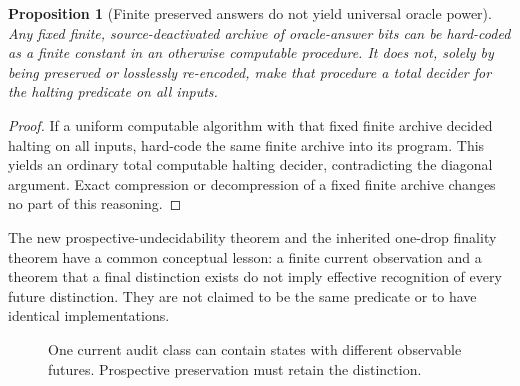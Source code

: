 \documentclass[11pt,letterpaper]{article}
\newtheorem{proposition}[theorem]{Proposition}
\theoremstyle{definition}
\begin{document}
\begin{proposition}[Finite preserved answers do not yield universal oracle power]
Any fixed finite, source-deactivated archive of oracle-answer bits can be hard-coded as a finite constant in an otherwise computable procedure. It does not, solely by being preserved or losslessly re-encoded, make that procedure a total decider for the halting predicate on all inputs.
\end{proposition}
\begin{proof}
If a uniform computable algorithm with that fixed finite archive decided halting on all inputs, hard-code the same finite archive into its program. This yields an ordinary total computable halting decider, contradicting the diagonal argument. Exact compression or decompression of a fixed finite archive changes no part of this reasoning.
\end{proof}

The new prospective-undecidability theorem and the inherited one-drop finality theorem have a common conceptual lesson: a finite current observation and a theorem that a final distinction exists do not imply effective recognition of every future distinction. They are not claimed to be the same predicate or to have identical implementations.

\begin{figure}[htbp]\centering
{}
\caption{One current audit class can contain states with different observable futures. Prospective preservation must retain the distinction.}
\label{fig:future-split}
\end{figure}
\end{document}
